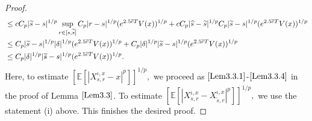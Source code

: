 \documentclass[11pt]{article}
\theoremstyle{theorem}
\theoremstyle{definition}
\newcommand{\1}{{\bf 1}}
\begin{document}
\begin{proof}
\begin{align*}
 & \leq  c C_p |\widetilde{s}-s|^{1/p} \sup_{r\in [s, \widetilde{s}]} C_p |r-s|^{1/p} (e^{2.5\overline{c}T}V(x))^{1/p} + c C_p |\widehat{s}-\widetilde{s}|^{1/p} C_p |\widetilde{s} - s|^{1/p} (e^{2.5\overline{c}T}V(x))^{1/p} \notag\\
 & \leq  C_p |\widetilde{s}-s|^{1/p}  |\delta|^{1/p} (e^{2.5\overline{c}T}V(x))^{1/p} +  C_p |\delta|^{1/p}  |\widetilde{s} - s|^{1/p} (e^{2.5\overline{c}T}V(x))^{1/p} \notag\\
  & \leq C_p |\delta|^{1/p} |\widetilde{s} -s|^{1/p} (e^{2.5\overline{c}T}V(x))^{1/p}.
\end{align*} 
Here, to estimate $\left[ \mathbb{E} \left[\left| X^{\iota,x}_{s, r}-x \right|^p \right]\right]^{1/p},$ we  proceed as $\eqref{Lem3.3.1}$-$\eqref{Lem3.3.4}$ in the proof of Lemma $\ref{Lem3.3}$. To estimate $\left[ \mathbb{E} \left[\left| X^{\iota,x}_{s, r}-X^{\iota,x}_{\widetilde{s}, r} \right|^p \right]\right]^{1/p},$ we use the statement (i) above. This finishes the desired proof.
\end{proof}
\end{document}
